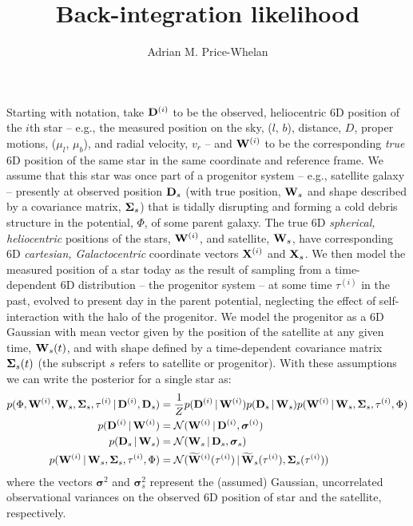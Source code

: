 \documentclass[letterpaper,12pt,preprint]{aastex}
\newcommand{\given}{\,|\,}
\newcommand{\D}{{\bf D}}
\newcommand{\W}{{\bf W}}
\newcommand{\X}{{\bf X}}
\newcommand{\bSigma}{{\bf \Sigma}}
\newcommand{\bsigma}{\boldsymbol\sigma}
\begin{document}
\title{Back-integration likelihood}
\author{Adrian M. Price-Whelan}

Starting with notation, take ${\bf D}^{(i)}$ to be the observed, heliocentric 6D position of the $i$th star -- e.g., the measured position on the sky, ($l$, $b$), distance, $D$, proper motions, ($\mu_l$, $\mu_b$), and radial velocity, $v_r$ -- and ${\bf W}^{(i)}$ to be the corresponding \emph{true} 6D position of the same star in the same coordinate and reference frame. We assume that this star was once part of a progenitor system -- e.g., satellite galaxy -- presently at observed position ${\bf D}_s$ (with true position, ${\bf W}_s$ and shape described by a covariance matrix, $\bSigma_s$) that is tidally disrupting and forming a cold debris structure in the potential, $\Phi$, of some parent galaxy. The true 6D \emph{spherical, heliocentric} positions of the stars, $\W^{(i)}$, and satellite, $\W_s$, have corresponding 6D \emph{cartesian, Galactocentric} coordinate vectors $\X^{(i)}$ and $\X_s$. We then model the measured position of a star today as the result of sampling from a time-dependent 6D distribution -- the progenitor system -- at some time $\tau^{(i)}$ in the past, evolved to present day in the parent potential, neglecting the effect of self-interaction with the halo of the progenitor. We model the progenitor as a 6D Gaussian with mean vector given by the position of the satellite at any given time, ${\bf W}_s(t)$, and with shape defined by a time-dependent covariance matrix $\bSigma_s(t)$ (the subscript $s$ refers to satellite or progenitor). With these assumptions we can write the posterior for a single star as:
\begin{align}
	p(\Phi, \W^{(i)}, \W_s, \bSigma_s, \tau^{(i)} \given \D^{(i)}, \D_s) &= 
		\frac{1}{Z} p(\D^{(i)} \given \W^{(i)}) p(\D_s \given \W_s) p(\W^{(i)} \given \W_s, \bSigma_s, \tau^{(i)}, \Phi)\\
	p(\D^{(i)} \given \W^{(i)}) &= \mathcal{N}(\W^{(i)} \given \D^{(i)}, \bsigma^{(i)})\\
	p(\D_s \given \W_s) &= \mathcal{N}(\W_s \given \D_s, \bsigma_s)\\
	p(\W^{(i)} \given \W_s, \bSigma_s, \tau^{(i)}, \Phi) &= \mathcal{N}(\widetilde{\W}^{(i)}(\tau^{(i)}) \given \widetilde{\W}_s(\tau^{(i)}), \bSigma_s(\tau^{(i)}))
\end{align}
where the vectors $\bsigma^{2}$ and $\bsigma_s^2$ represent the (assumed) Gaussian, uncorrelated observational variances on the observed 6D position of star and the satellite, respectively.
\end{document}
